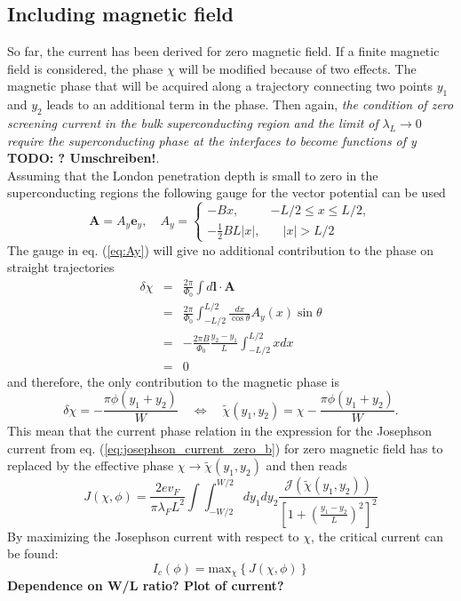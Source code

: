 \subsection*{Including magnetic field}
So far, the current has been derived for zero magnetic field. If a finite magnetic field is considered, the phase $\chi$ will be modified because of two effects. The magnetic phase that will be acquired along a trajectory connecting two points $y_1$ and $y_2$  leads to an additional term in the phase. Then again, \textit{the condition of zero screening current in the bulk superconducting region and the limit of} $\lambda_L \rightarrow 0$ \textit{require the superconducting phase at the interfaces to become functions of y} \textbf{TODO: ? Umschreiben!}.\\
Assuming that the London penetration depth is small to zero in the superconducting regions the following gauge for the vector potential can be used
\begin{equation}
\mathbf{A}=A_y \mathbf{e}_y, \quad
A_y=\left\{ 
		\begin{array}{ll}
				-B x, & -L/2 \leq x \leq L/2, \\[0.2cm] 
				-\frac{1}{2} B L |x| , & \quad |x|>L/2
		\end{array} 
	\right.
\label{eq:Ay}
\end{equation}
The gauge in eq. (\ref{eq:Ay}) will give no additional contribution to the phase on straight trajectories
\begin{eqnarray}
\delta \chi &=& \frac{2 \pi}{\Phi_0} \int d \mathbf{l} \cdot \mathbf{A} \\
&=& \frac{2 \pi}{\Phi_0} \int_{-L/2}^{L/2} \frac{dx}{\cos \theta} A_y (x) \sin \theta \\
&=& - \frac{2 \pi B}{\Phi_0} \frac{y_2 - y_1}{L} \int_{-L/2}^{L/2} x dx \\
&=& 0
\end{eqnarray}
and therefore, the only contribution to the magnetic phase is
\begin{equation}
\delta \chi = -\frac{\pi \phi (y_1 + y_2)}{W} \quad \Leftrightarrow \quad \tilde{\chi}(y_1, y_2) = \chi  -\frac{\pi \phi (y_1 + y_2)}{W}.
\label{eq:chi_plane}
\end{equation}
This mean that the current phase relation in the expression for the Josephson current from eq. (\ref{eq:josephson_current_zero_b}) for zero magnetic field has to replaced by the effective phase $\chi \rightarrow \tilde{\chi}(y_1, y_2)$ and then reads
\begin{equation}
J\left(\chi, \phi \right) = \frac{2 e v_F}{\pi \lambda_F L^2}  \int \int_{-W/2}^{W/2} d y_1 d y_2 \frac{\mathcal{J}(\tilde{\chi}(y_1, y_2))}{\left[ 1 + \left(\frac{y_1 - y_2}{L}\right)^2\right]^2}
\label{eq:josephson_current}
\end{equation}
By maximizing the Josephson current with respect to $\chi$, the critical current can be found:
\begin{equation}
I_c(\phi) = \text{max}_{\chi}\left\{ J(\chi, \phi) \right\}
\end{equation}
\textbf{Dependence on W/L ratio? Plot of current?}

